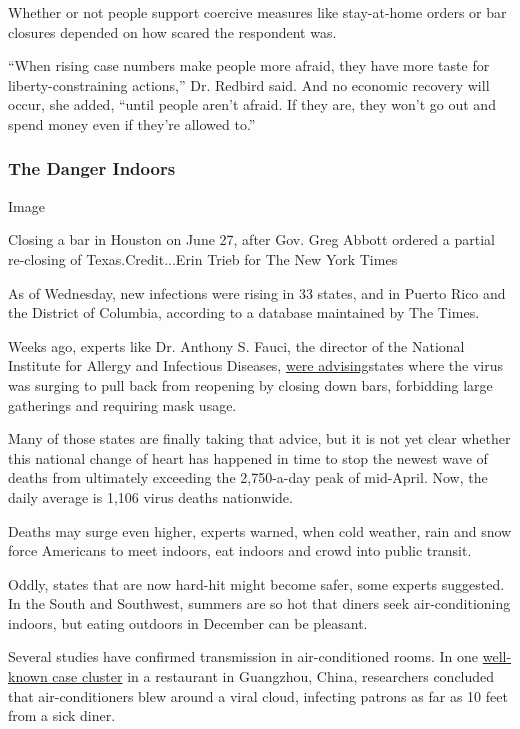 Whether or not people support coercive measures like stay-at-home orders
or bar closures depended on how scared the respondent was.

``When rising case numbers make people more afraid, they have more taste
for liberty-constraining actions,'' Dr. Redbird said. And no economic
recovery will occur, she added, ``until people aren't afraid. If they
are, they won't go out and spend money even if they're allowed to.''

\hypertarget{the-danger-indoors}{%
\subsubsection{The Danger Indoors}\label{the-danger-indoors}}

Image

Closing a bar in Houston on June 27, after Gov. Greg Abbott ordered a
partial re-closing of Texas.Credit...Erin Trieb for The New York Times

As of Wednesday, new infections were rising in 33 states, and in Puerto
Rico and the District of Columbia, according to a database maintained by
The Times.

Weeks ago, experts like Dr. Anthony S. Fauci, the director of the
National Institute for Allergy and Infectious Diseases,
\href{https://www.pbs.org/newshour/show/how-fauci-says-the-u-s-can-get-control-of-the-pandemic}{were
advising}states where the virus was surging to pull back from reopening
by closing down bars, forbidding large gatherings and requiring mask
usage.

Many of those states are finally taking that advice, but it is not yet
clear whether this national change of heart has happened in time to stop
the newest wave of deaths from ultimately exceeding the 2,750-a-day peak
of mid-April. Now, the daily average is 1,106 virus deaths nationwide.

Deaths may surge even higher, experts warned, when cold weather, rain
and snow force Americans to meet indoors, eat indoors and crowd into
public transit.

Oddly, states that are now hard-hit might become safer, some experts
suggested. In the South and Southwest, summers are so hot that diners
seek air-conditioning indoors, but eating outdoors in December can be
pleasant.

Several studies have confirmed transmission in air-conditioned rooms. In
one
\href{https://www.nytimes.com/2020/04/20/health/airflow-coronavirus-restaurants.html}{well-known
case cluster} in a restaurant in Guangzhou, China, researchers concluded
that air-conditioners blew around a viral cloud, infecting patrons as
far as 10 feet from a sick diner.

